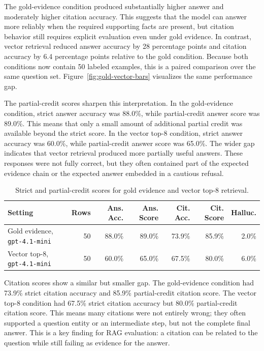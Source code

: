 \documentclass[10pt,twocolumn]{article}
\begin{document}
The gold-evidence condition produced substantially higher answer and moderately higher citation accuracy. This suggests that the model can answer more reliably when the required supporting facts are present, but citation behavior still requires explicit evaluation even under gold evidence. In contrast, vector retrieval reduced answer accuracy by 28 percentage points and citation accuracy by 6.4 percentage points relative to the gold condition. Because both conditions now contain 50 labeled examples, this is a paired comparison over the same question set. Figure~\ref{fig:gold-vector-bars} visualizes the same performance gap.

The partial-credit scores sharpen this interpretation. In the gold-evidence condition, strict answer accuracy was 88.0\%, while partial-credit answer score was 89.0\%. This means that only a small amount of additional partial credit was available beyond the strict score. In the vector top-8 condition, strict answer accuracy was 60.0\%, while partial-credit answer score was 65.0\%. The wider gap indicates that vector retrieval produced more partially useful answers. These responses were not fully correct, but they often contained part of the expected evidence chain or the expected answer embedded in a cautious refusal.

\begin{table}[t]
\centering
\small
\begin{tabular}{lrrrrrr}
\toprule
\textbf{Setting} & \textbf{Rows} & \textbf{Ans. Acc.} & \textbf{Ans. Score} & \textbf{Cit. Acc.} & \textbf{Cit. Score} & \textbf{Halluc.} \\
\midrule
Gold evidence, \texttt{gpt-4.1-mini} & 50 & 88.0\% & 89.0\% & 73.9\% & 85.9\% & 2.0\% \\
Vector top-8, \texttt{gpt-4.1-mini} & 50 & 60.0\% & 65.0\% & 67.5\% & 80.0\% & 6.0\% \\
\bottomrule
\end{tabular}
\caption{Strict and partial-credit scores for gold evidence and vector top-8 retrieval.}
\label{tab:gold-vector-full}
\end{table}

Citation scores show a similar but smaller gap. The gold-evidence condition had 73.9\% strict citation accuracy and 85.9\% partial-credit citation score. The vector top-8 condition had 67.5\% strict citation accuracy but 80.0\% partial-credit citation score. This means many citations were not entirely wrong; they often supported a question entity or an intermediate step, but not the complete final answer. This is a key finding for RAG evaluation: a citation can be related to the question while still failing as evidence for the answer.
\end{document}
